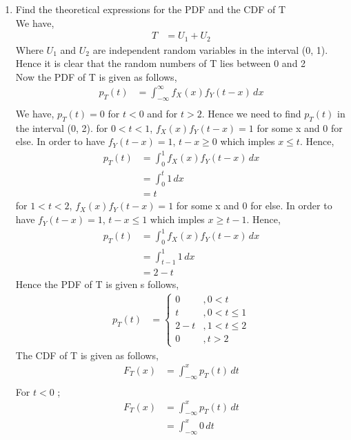 \documentclass[journal,12pt,twocolumn]{article}
\renewcommand\thesection{\arabic{section}}
\begin{document}
\begin{enumerate}[label=\thesection.\arabic*
,ref=\thesection.\theenumi]
\item
Find the theoretical expressions for the PDF and the CDF of T
\\
\solution
We have,
\begin{align}
	T &= U_1 + U_2 
\end{align}
Where $U_1$ and $U_2$ are independent random variables in the interval (0, 1). Hence it is clear that the random numbers of T lies between 0 and 2\\
Now the PDF of T is given as follows,
\begin{align}
	p_T(t) &= \int_{-\infty}^{\infty} f_X(x)f_Y(t-x) \, dx \\ 
\end{align}
We have, $p_T(t) = 0$ for $t < 0$ and for $t > 2$. Hence we need to find $p_T(t)$ in the interval (0, 2).\newline
for $0 < t < 1 $, $f_X(x)f_Y(t-x) = 1$ for some x and 0 for else. In order to have $f_Y(t-x) = 1$, $t-x \geq 0$ which imples $x \leq t$. Hence,
\begin{align}
	p_T(t) &= \int_{0}^{1} f_X(x)f_Y(t-x) \, dx \\
	&= \int_{0}^{t} 1 \,dx \\
	&= t
\end{align}
for $1 < t < 2$, $f_X(x)f_Y(t-x) = 1$ for some x and 0 for else. In order to have $f_Y(t-x) = 1$, $t-x \leq 1$ which imples $x \geq t-1$. Hence,
\begin{align}
	p_T(t) &= \int_{0}^{1} f_X(x)f_Y(t-x) \, dx \\
	&= \int_{t-1}^{1} 1 \,dx \\
	&= 2 - t
\end{align}
Hence the PDF of T is given s follows,
\begin{align}
	p_T(t) &= \begin{cases} 0 &, 0 < t \\
	t &, 0 < t \leq 1 \\
	2 - t &, 1 < t \leq 2 \\
	0 &, t > 2 \end{cases} 
\end{align}
The CDF of T is given as follows,
\begin{align}
	F_T(x) &= \int_{-\infty}^{x} p_T(t) \, dt \\
\end{align}
For $t < 0$ ;
\begin{align}
	F_T(x) &= \int_{-\infty}^{x} p_T(t) \, dt \\
	&= \int_{-\infty}^{x} 0 \, dt \\

\end{align}
\end{enumerate}
\end{document}
